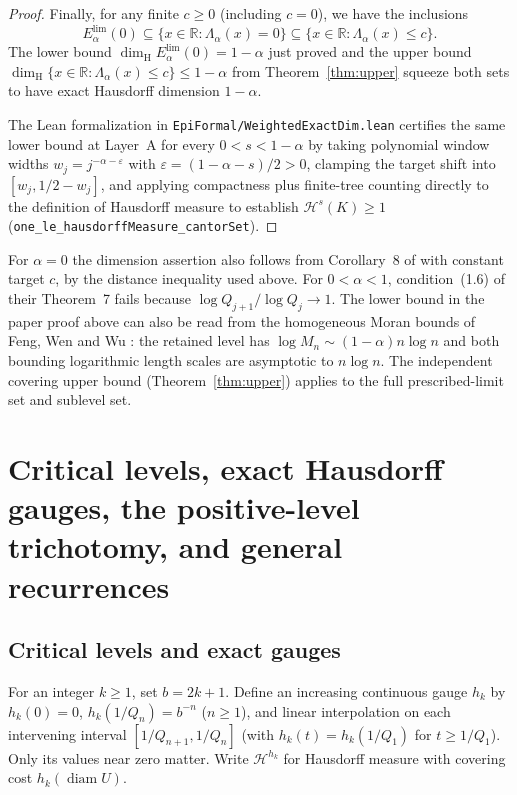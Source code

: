 \documentclass[11pt]{article}
\theoremstyle{definition}
\theoremstyle{remark}
\newcommand{\R}{\mathbb{R}}
\newcommand{\dimH}{\dim_{\mathrm{H}}}
\newcommand{\Lam}{\Lambda}
\begin{document}
\begin{proof}
Finally, for any finite $c\ge0$ (including $c=0$), we have the inclusions
\[
E_{\alpha}^{\mathrm{lim}}(0)
\subseteq\{x\in\R:\Lam_\alpha(x)=0\}
\subseteq\{x\in\R:\Lam_\alpha(x)\le c\}.
\]
The lower bound $\dimH E_{\alpha}^{\mathrm{lim}}(0)=1-\alpha$ just proved and
the upper bound $\dimH\{x\in\R:\Lam_\alpha(x)\le c\}\le1-\alpha$ from
Theorem~\ref{thm:upper} squeeze both sets to have exact Hausdorff dimension
$1-\alpha$.

The Lean formalization in \texttt{EpiFormal/\allowbreak WeightedExactDim.lean}
certifies the same lower bound at Layer~A for every $0<s<1-\alpha$ by taking
polynomial window widths $w_j=j^{-\alpha-\varepsilon}$ with
$\varepsilon=(1-\alpha-s)/2>0$, clamping the target shift into
$[w_j,1/2-w_j]$, and applying compactness plus finite-tree counting directly to
the definition of Hausdorff measure to establish
$\mathcal H^s(K)\ge1$ (\texttt{one\_le\_hausdorffMeasure\_cantorSet}).
\end{proof}

For $\alpha=0$ the dimension assertion also follows from Corollary~8 of
\cite{BLR} with constant target $c$, by the distance inequality used
above. For $0<\alpha<1$, condition~(1.6) of their Theorem~7 fails because
$\log Q_{j+1}/\log Q_j\to1$. The lower bound in the paper proof above can also
be read from the homogeneous Moran bounds of Feng, Wen and Wu \cite{FWW}: the
retained level has $\log M_n\sim(1-\alpha)n\log n$ and both bounding logarithmic
length scales are asymptotic to $n\log n$. The independent covering upper bound
(Theorem~\ref{thm:upper}) applies to the full prescribed-limit set and sublevel
set.

\section{Critical levels, exact Hausdorff gauges, the positive-level trichotomy, and general recurrences}\label{sec:gauge}

\subsection{Critical levels and exact gauges}

For an integer $k\ge1$, set $b=2k+1$. Define an increasing continuous
gauge $h_k$ by $h_k(0)=0$, $h_k(1/Q_n)=b^{-n}$ ($n\ge1$), and
linear interpolation on each intervening interval $[1/Q_{n+1},1/Q_n]$ (with
$h_k(t)=h_k(1/Q_1)$ for $t\ge1/Q_1$). Only its values near zero matter. Write
$\mathcal H^{h_k}$ for Hausdorff measure with covering cost
$h_k(\operatorname{diam} U)$.
\end{document}
